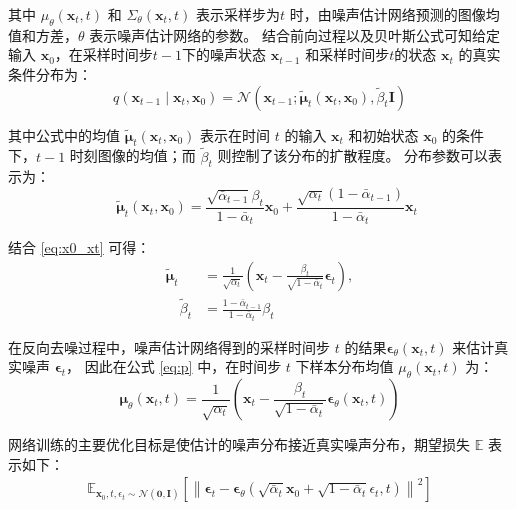 其中 $\mu_\theta\left(\mathbf{x}_t, t\right)$ 和 $\Sigma_\theta\left(\mathbf{x}_t, t\right)$ 表示采样步为$t$ 时，由噪声估计网络预测的图像均值和方差，$\theta$ 表示噪声估计网络的参数。
结合前向过程以及贝叶斯公式可知给定输入 $\mathbf{x}_0$，在采样时间步$t-1$下的噪声状态 $\mathbf{x}_{t-1}$ 和采样时间步$t$的状态 $\mathbf{x}_t$ 的真实条件分布为：
\begin{equation}
    \label{eq:real_q}
    q\left(\mathbf{x}_{t-1} \mid \mathbf{x}_t, \mathbf{x}_0\right)=\mathcal{N}\left(\mathbf{x}_{t-1} ; \tilde{\boldsymbol{\mu}}_t\left(\mathbf{x}_t, \mathbf{x}_0\right), \tilde{\beta}_t \mathbf{I}\right) 
\end{equation}

其中公式中的均值 $\tilde{\boldsymbol{\mu}}_t(\mathbf{x}_t, \mathbf{x}_0)$ 表示在时间 $t$ 的输入 $\mathbf{x}_t$ 和初始状态 $\mathbf{x}_0$ 的条件下，$t-1$ 时刻图像的均值；而 $\tilde{\beta}_t$ 则控制了该分布的扩散程度。
分布参数可以表示为：
\begin{equation}
    \quad\tilde{\boldsymbol{\mu}}_t\left(\mathbf{x}_t, \mathbf{x}_0\right)=\frac{\sqrt{\bar{\alpha}_{t-1}} \beta_t}{1-\bar{\alpha}_t} \mathbf{x}_0+\frac{\sqrt{\alpha_t}\left(1-\bar{\alpha}_{t-1}\right)}{1-\bar{\alpha}_t} \mathbf{x}_t
\end{equation}


结合 \eqref{eq:x0_xt} 可得：
\begin{equation}
\begin{split}
 \tilde{\boldsymbol{\mu}}_t &=\frac{1}{\sqrt{\alpha_t}}\left(\mathbf{x}_t-\frac{\beta_t}{\sqrt{1-\bar{\alpha}_t}} \boldsymbol{\epsilon}_t\right), \\
    \quad \tilde{\beta}_t &=\frac{1-\bar{\alpha}_{t-1}}{1-\bar{\alpha}_t} \beta_t
\end{split}
\end{equation}

在反向去噪过程中，噪声估计网络得到的采样时间步 $t$ 的结果$\boldsymbol{\epsilon}_\theta\left(\mathbf{x}_t, t\right)$ 来估计真实噪声 $\boldsymbol{\epsilon}_t$，
因此在公式 \eqref{eq:p} 中，在时间步 $t$ 下样本分布均值 $\mu_\theta\left(\mathbf{x}_t, t\right)$ 为：
\begin{equation}
    \boldsymbol{\mu}_\theta\left(\mathbf{x}_t, t\right)=\frac{1}{\sqrt{\alpha_t}}\left(\mathbf{x}_t-\frac{\beta_t}{\sqrt{1-\bar{\alpha}_t}} \boldsymbol{\epsilon}_\theta\left(\mathbf{x}_t, t\right)\right)
\end{equation}

网络训练的主要优化目标是使估计的噪声分布接近真实噪声分布，期望损失 $\mathbb{E}$ 表示如下：
\begin{equation}
\begin{split}
    \mathbb{E}_{\mathbf{x}_0, t, \epsilon_t \sim \mathcal{N}(\mathbf{0}, \mathbf{I})}\left[\left\|\boldsymbol{\epsilon}_t -\boldsymbol{\epsilon}_\theta\left(\sqrt{\bar{\alpha}_t} \mathbf{x}_0+\sqrt{1-\bar{\alpha}_t} \epsilon_t, t\right)\right\|^2\right]
\end{split}
\end{equation}

